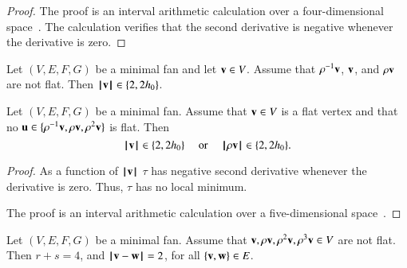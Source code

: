 \begin{proof}
The proof is an interval arithmetic calculation over a four-dimensional space~\cite[cc:d2a]{hales:2009:nonlinear}.  %
The calculation verifies  that the second derivative is negative whenever the derivative is zero.
\end{proof}


\begin{corollary}
Let $(V,E,F,G)$ be a minimal fan and let ${\mathbf v}\in V$.  Assume that $\rho^{-1}{\mathbf v}$, ${\mathbf v}$, and $\rho {\mathbf v}$ are not flat.
Then ${{\hskip0.1em|\hskip-0.15em|\hskip0.1em}{\mathbf v}{\hskip0.1em|\hskip-0.15em|\hskip0.1em}}\in \{2,2{h_0}\}$.
\end{corollary}




\begin{lemma}  %
Let $(V,E,F,G)$ be a minimal fan.
Assume that ${\mathbf v}\in V$ is a flat vertex and that no ${\mathbf u}\in\{\rho^{-1}{\mathbf v},\rho {\mathbf v},\rho^2 {\mathbf v}\}$ is flat.
Then 
$$
{{\hskip0.1em|\hskip-0.15em|\hskip0.1em}{\mathbf v}{\hskip0.1em|\hskip-0.15em|\hskip0.1em}}\in \{2,2{h_0}\}\quad\text{ or }\quad{{\hskip0.1em|\hskip-0.15em|\hskip0.1em}\rho {\mathbf v}{\hskip0.1em|\hskip-0.15em|\hskip0.1em}}\in \{2,2{h_0}\}.
$$
\end{lemma}

\begin{proof}
As a function of ${{\hskip0.1em|\hskip-0.15em|\hskip0.1em}{\mathbf v}{\hskip0.1em|\hskip-0.15em|\hskip0.1em}}$
 $\tau$ has negative second derivative whenever the derivative is zero.  Thus, $\tau$ has no local minimum.

The proof is an interval arithmetic calculation over a five-dimensional space~\cite[cc:d2b]{hales:2009:nonlinear}. %
\end{proof}





\begin{lemma}
Let $(V,E,F,G)$ be a minimal fan.
Assume that ${\mathbf v},\rho {\mathbf v},\rho^2 {\mathbf v},\rho^3 {\mathbf v}\in V$ are not flat.
Then $r+s=4$, and ${\hskip0.1em|\hskip-0.15em|\hskip0.1em}{\mathbf v} - {\mathbf w}{\hskip0.1em|\hskip-0.15em|\hskip0.1em}= 2$, for all $\{{\mathbf v},{\mathbf w}\}\in E$.
\end{lemma}
%

